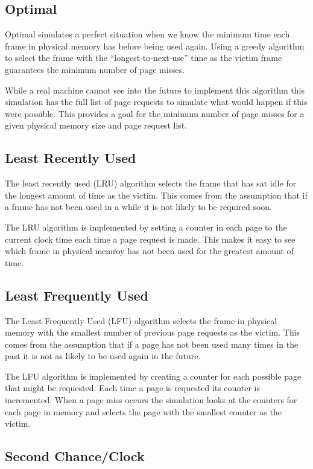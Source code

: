 \documentclass[11pt]{article}
\begin{document}
\begin{multicols}{2}
\subsection{Optimal}
Optimal simulates a perfect situation when we know the minimum time each frame in physical memory has before being used again. Using a greedy algorithm to select the frame with the ``longest-to-next-use'' time as the victim frame guarantees the minimum number of page misses. 

While a real machine cannot see into the future to implement this algorithm this simulation has the full list of page requests to simulate what would happen if this were possible. This provides a goal for the minimum number of page misses for a given physical memory size and page request list.

\subsection{Least Recently Used}
The least recently used (LRU) algorithm selects the frame that has sat idle for the longest amount of time as the victim. This comes from the assumption that if a frame has not been used in a while it is not likely to be required soon. 

The LRU algorithm is implemented by setting a counter in each page to the current clock time each time a page request is made. This makes it easy to see which frame in physical memroy has not been used for the greatest amount of time.

\subsection{Least Frequently Used}
The Least Frequently Used (LFU) algorithm selects the frame in physical memory with the smallest number of previous page requests as the victim. This comes from the assumption that if a page has not been used many times in the past it is not as likely to be used again in the future.

The LFU algorithm is implemented by creating a counter for each possible page that might be requested. Each time a page is requested its counter is incremented. When a page miss occurs the simulation looks at the counters for each page in memory and selects the page with the smallest counter as the victim.

\subsection{Second Chance/Clock}


\end{multicols}
\end{document}
